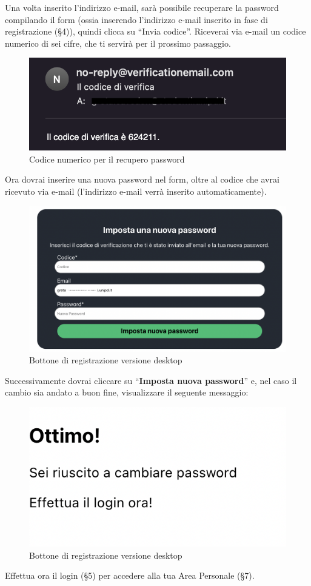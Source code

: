 Una volta inserito l'indirizzo e-mail, sarà possibile recuperare la password compilando il form (ossia inserendo l'indirizzo e-mail inserito in fase di registrazione (\S{4})), quindi clicca su “Invia codice”. Riceverai via e-mail un codice numerico di sei cifre, che ti servirà per il prossimo passaggio.

\begin{figure}[H]
\centering
\includegraphics[scale=0.45]{./images/RecuperoPassword/emailRecupero.png} 
\caption{Codice numerico per il recupero password}
\end{figure}

Ora dovrai inserire una nuova password nel form, oltre al codice che avrai ricevuto via e-mail (l'indirizzo e-mail verrà inserito automaticamente).

\begin{figure}[H]
\centering
\includegraphics[scale=0.3]{./images/RecuperoPassword/FormNuovaPsw.png} 
\caption{Bottone di registrazione versione desktop}
\end{figure}

Successivamente dovrai cliccare su “\textbf{Imposta nuova password}” e, nel caso il cambio sia andato a buon fine, visualizzare il seguente messaggio:

\begin{figure}[H]
\centering
\includegraphics[scale=0.5]{./images/RecuperoPassword/cambioRiusciuto.png} 
\caption{Bottone di registrazione versione desktop}
\end{figure}

Effettua ora il login (\S{5}) per accedere alla tua Area Personale (\S{7}).
